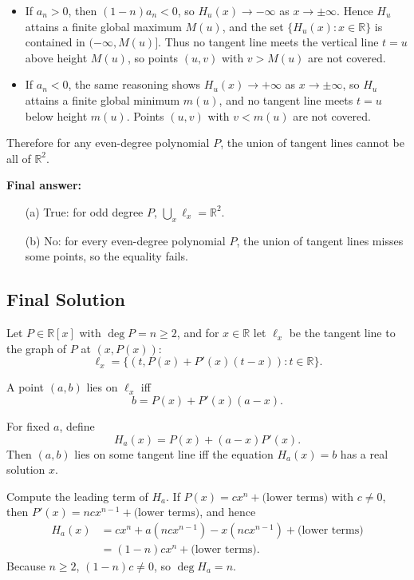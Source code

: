 \documentclass[12pt,a4paper]{article}
\theoremstyle{definition}
\begin{document}
    \begin{itemize}
        \item If $a_n > 0$, then $(1 - n) a_n < 0$, so $H_u(x) \to -\infty$ as $x \to \pm\infty$. Hence $H_u$ attains a finite global maximum $M(u)$, and the set $\{H_u(x) : x \in \mathbb{R}\}$ is contained in $(-\infty, M(u)]$. Thus no tangent line meets the vertical line $t = u$ above height $M(u)$, so points $(u, v)$ with $v > M(u)$ are not covered.

        \item If $a_n < 0$, the same reasoning shows $H_u(x) \to +\infty$ as $x \to \pm\infty$, so $H_u$ attains a finite global minimum $m(u)$, and no tangent line meets $t = u$ below height $m(u)$. Points $(u, v)$ with $v < m(u)$ are not covered.
    \end{itemize}

    Therefore for any even-degree polynomial $P$, the union of tangent lines cannot be all of $\mathbb{R}^2$.

    \textbf{Final answer:}
    \begin{itemize}
        \item[(a)] True: for odd degree $P$, $\bigcup_x \ell_x = \mathbb{R}^2$.
        \item[(b)] No: for every even-degree polynomial $P$, the union of tangent lines misses some points, so the equality fails.
    \end{itemize}

    \subsection{Final Solution}
    Let $P \in \mathbb{R}[x]$ with $\deg P = n \geq 2$, and for $x \in \mathbb{R}$ let $\ell_x$ be the tangent line to the graph of $P$ at $(x, P(x))$:
    $$\ell_x = \{ (t, P(x) + P'(x)(t - x)) : t \in \mathbb{R} \}.$$

    A point $(a, b)$ lies on $\ell_x$ iff
    $$b = P(x) + P'(x)(a - x).$$

    For fixed $a$, define
    $$H_a(x) = P(x) + (a - x)P'(x).$$
    Then $(a, b)$ lies on some tangent line iff the equation $H_a(x) = b$ has a real solution $x$.

    Compute the leading term of $H_a$. If $P(x) = c x^n + \text{(lower terms)}$ with $c \neq 0$, then $P'(x) = n c x^{n-1} + \text{(lower terms)}$, and hence
    \begin{align}
        H_a(x) &= c x^n + a(n c x^{n-1}) - x(n c x^{n-1}) + \text{(lower terms)}\\
        &= (1 - n)c x^n + \text{(lower terms)}.
    \end{align}
    Because $n \geq 2$, $(1 - n)c \neq 0$, so $\deg H_a = n$.
\end{document}
